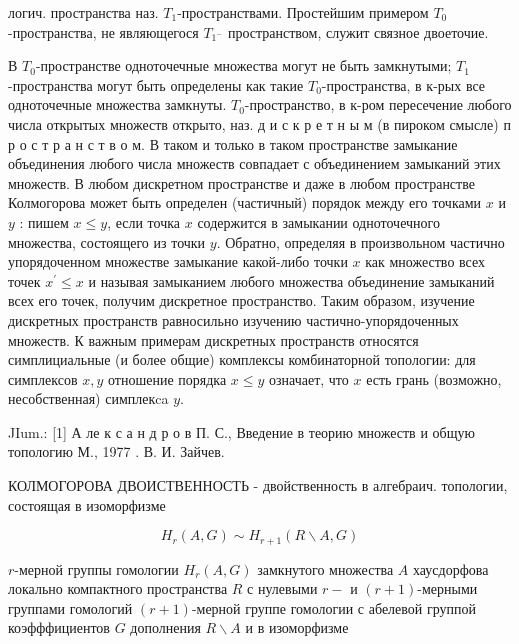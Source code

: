 \documentclass[10pt]{article}
\begin{document}
логич. пространства наз. $T_{1}$-пространствами. Простейшим примером $T_{0}$-пространства, не являющегося $T_{1^{-}}$ пространством, служит связное двоеточие.



В $T_{0}$-пространстве одноточечные множества могут не быть замкнутыми; $T_{1}$-пространства могут быть определены как такие $T_{0}$-пространства, в к-рых все одноточечные множества замкнуты. $T_{0}$-пространство, в к-ром пересечение любого числа открытых множеств открыто, наз. д и с к р е т н ы м (в пироком смысле) п р о с т р а н с т в о м. В таком и только в таком пространстве замыкание объединения любого числа множеств совпадает с объединением замыканий этих множеств. В любом дискретном пространстве и даже в любом пространстве Колмогорова может быть определен (частичный) порядок между его точками $x$ и $y$ : пишем $x \leqslant y$, если точка $x$ содержится в замыкании одноточечного множества, состоящего из точки $y$. Обратно, определяя в произвольном частично упорядоченном множестве замыкание какой-либо точки $x$ как множество всех точек $x^{\prime} \leqslant x$ и называя замыканием любого множества объединение замыканий всех его точек, получим дискретное пространство. Таким образом, изучение дискретных пространств равносильно изучению частично-упорядоченных множеств. К важным примерам дискретных пространств относятся симплициальные (и более общие) комплексы комбинаторной топологии: для симплексов $x, y$ отношение порядка $x \leqslant y$ означает, что $x$ есть грань (возможно, несобственная) симплекca $y$.



JIum.: [1] А ле к с а н д р о в П. С., Введение в теорию множеств и общую топологию М., 1977 . В. И. Зайчев.



КОЛМОГОРОВА ДВОИСТВЕННОСТЬ - двойственность в алгебраич. топологии, состоящая в изоморфизме



\[

H_{r}(A, G) \sim H_{r+1}(R \backslash A, G)

\]



$r$-мерной группы гомологии $H_{r}(A, G)$ замкнутого множества $A$ хаусдорфова локально компактного пространства $R$ с нулевыми $r-$ и $(r+1)$-мерными группами гомологий $(r+1)$-мерной группе гомологии с абелевой группой коэфффициентов $G$ дополнения $R \backslash A$ и в изоморфизме
\end{document}
